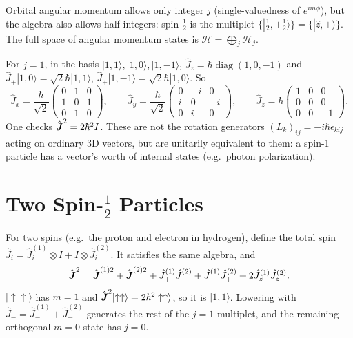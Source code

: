 Orbital angular momentum allows only integer $j$ (single-valuedness of $e^{im\phi}$), but the algebra also allows half-integers: spin-$\frac12$ is the multiplet $\{|\tfrac12,\pm\tfrac12\rangle\} = \{|\hat{z},\pm\rangle\}$. The full space of angular momentum states is $\mathcal{H} = \bigoplus_j\mathcal{H}_j$.

\begin{example}
For $j = 1$, in the basis $|1,1\rangle,|1,0\rangle,|1,-1\rangle$, $\hat{J}_z = \hbar\operatorname{diag}(1,0,-1)$ and $\hat{J}_+|1,0\rangle = \sqrt2\hbar|1,1\rangle$, $\hat{J}_+|1,-1\rangle = \sqrt2\hbar|1,0\rangle$. So
\[
    \hat{J}_x = \frac{\hbar}{\sqrt2}\begin{pmatrix}0&1&0\\1&0&1\\0&1&0\end{pmatrix},
    \qquad
    \hat{J}_y = \frac{\hbar}{\sqrt2}\begin{pmatrix}0&-i&0\\i&0&-i\\0&i&0\end{pmatrix},
    \qquad
    \hat{J}_z = \hbar\begin{pmatrix}1&0&0\\0&0&0\\0&0&-1\end{pmatrix}.
\]
One checks $\hat{\vect{J}}^2 = 2\hbar^2I$. These are not the rotation generators $(L_k)_{ij} = -i\hbar\epsilon_{kij}$ acting on ordinary 3D vectors, but are unitarily equivalent to them: a spin-1 particle has a vector's worth of internal states (e.g.\ photon polarization).
\end{example}

\section{Two Spin-\texorpdfstring{$\tfrac12$}{1/2} Particles}

For two spins (e.g.\ the proton and electron in hydrogen), define the total spin $\hat{J}_i = \hat{J}_i^{(1)}\otimes I + I\otimes\hat{J}_i^{(2)}$. It satisfies the same algebra, and
\[
    \hat{\vect{J}}^2 = \hat{\vect{J}}^{(1)2} + \hat{\vect{J}}^{(2)2} + \hat{J}_+^{(1)}\hat{J}_-^{(2)} + \hat{J}_-^{(1)}\hat{J}_+^{(2)} + 2\hat{J}_z^{(1)}\hat{J}_z^{(2)} .
\]
$|{\uparrow\uparrow}\rangle$ has $m = 1$ and $\hat{\vect{J}}^2|{\uparrow\uparrow}\rangle = 2\hbar^2|{\uparrow\uparrow}\rangle$, so it is $|1,1\rangle$. Lowering with $\hat{J}_- = \hat{J}_-^{(1)} + \hat{J}_-^{(2)}$ generates the rest of the $j = 1$ multiplet, and the remaining orthogonal $m = 0$ state has $j = 0$.


